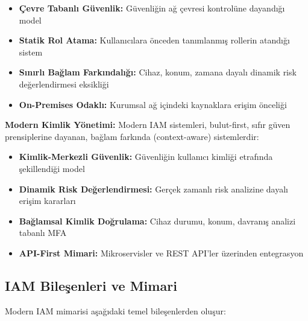\begin{itemize}
    \item \textbf{Çevre Tabanlı Güvenlik:} Güvenliğin ağ çevresi kontrolüne dayandığı model
    \item \textbf{Statik Rol Atama:} Kullanıcılara önceden tanımlanmış rollerin atandığı sistem
    \item \textbf{Sınırlı Bağlam Farkındalığı:} Cihaz, konum, zamana dayalı dinamik risk değerlendirmesi eksikliği
    \item \textbf{On-Premises Odaklı:} Kurumsal ağ içindeki kaynaklara erişim önceliği
\end{itemize}

\textbf{Modern Kimlik Yönetimi:}
Modern IAM sistemleri, bulut-first, sıfır güven prensiplerine dayanan, bağlam farkında (context-aware) sistemlerdir:

\begin{itemize}
    \item \textbf{Kimlik-Merkezli Güvenlik:} Güvenliğin kullanıcı kimliği etrafında şekillendiği model
    \item \textbf{Dinamik Risk Değerlendirmesi:} Gerçek zamanlı risk analizine dayalı erişim kararları
    \item \textbf{Bağlamsal Kimlik Doğrulama:} Cihaz durumu, konum, davranış analizi tabanlı MFA
    \item \textbf{API-First Mimari:} Mikroservisler ve REST API'ler üzerinden entegrasyon
\end{itemize}

\subsection{IAM Bileşenleri ve Mimari}

Modern IAM mimarisi aşağıdaki temel bileşenlerden oluşur:

